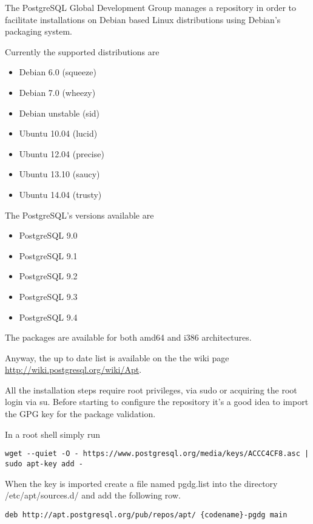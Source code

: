 The PostgreSQL Global Development Group manages a repository in order to facilitate 
installations on Debian based Linux distributions using Debian's packaging system. 

Currently the supported distributions are

\begin{itemize}
 \item Debian 6.0 (squeeze)
 \item Debian 7.0 (wheezy)
 \item Debian unstable (sid) 
 \item Ubuntu 10.04 (lucid)
 \item Ubuntu 12.04 (precise)
 \item Ubuntu 13.10 (saucy)
 \item Ubuntu 14.04 (trusty) 
\end{itemize}

The PostgreSQL's versions available are 
\begin{itemize}
 \item PostgreSQL 9.0 
 \item PostgreSQL 9.1 
 \item PostgreSQL 9.2 
 \item PostgreSQL 9.3
 \item PostgreSQL 9.4
\end{itemize}

The packages are available for both amd64 and i386 architectures.

Anyway, the up to date list is available on the the wiki page 
\href{http://wiki.postgresql.org/wiki/Apt}{http://wiki.postgresql.org/wiki/Apt}.\newline

All the installation steps require root privileges, via sudo or acquiring the root login via su.
Before starting to configure the repository it's a good idea to import the GPG key for the
package validation.

In a root shell simply run
\begin{verbatim}
wget --quiet -O - https://www.postgresql.org/media/keys/ACCC4CF8.asc | sudo apt-key add -
\end{verbatim}
When the key is imported create a file named pgdg.list into the directory /etc/apt/sources.d/ and
add the following row.

\begin{verbatim}
deb http://apt.postgresql.org/pub/repos/apt/ {codename}-pgdg main
\end{verbatim}


